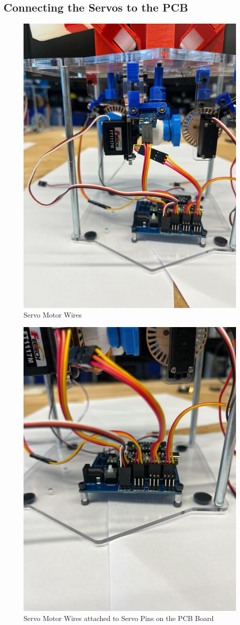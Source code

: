 \documentclass{article}
\begin{document}
\subsection{Connecting the Servos to the PCB}

\begin{figure}[H]
    \centering
    \includegraphics[width=0.5\linewidth]{PCBImages/ServoWires/servo_wires_1.jpg}
    \caption{Servo Motor Wires}
    \label{fig:enter-label}
\end{figure}

\begin{figure}[H]
    \centering
    \includegraphics[width=0.5\linewidth]{PCBImages/ServoWires/servo_wires_2.jpg}
    \caption{Servo Motor Wires attached to Servo Pins on the PCB Board}
    \label{fig:enter-label}
\end{figure}
\end{document}
